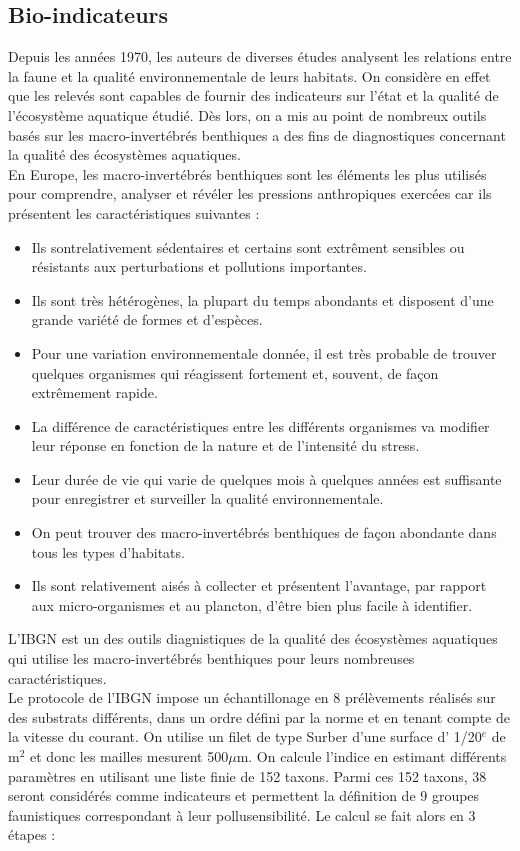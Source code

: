 \documentclass[10pt, article]{llncs}
\begin{document}
		\subsection{Bio-indicateurs}
			Depuis les années 1970, les auteurs de diverses études analysent les relations entre la faune et la qualité environnementale de leurs habitats. On considère en effet que les relevés sont capables de fournir des indicateurs sur l'état et la qualité de l'écosystème aquatique étudié. Dès lors, on a mis au point de nombreux outils basés sur les macro-invertébrés benthiques a des fins de diagnostiques concernant la qualité des écosystèmes aquatiques.\\
			En Europe, les macro-invertébrés benthiques sont les éléments les plus utilisés pour comprendre, analyser et révéler les pressions anthropiques exercées car ils présentent les caractéristiques suivantes :
			\begin{itemize}
				\item Ils sontrelativement sédentaires et certains sont extrêment sensibles ou résistants aux perturbations et pollutions importantes.
				\item Ils sont très hétérogènes, la plupart du temps abondants et disposent d'une grande variété de formes et d'espèces.
				\item Pour une variation environnementale donnée, il est très probable de trouver quelques organismes qui réagissent fortement et, souvent, de façon extrêmement rapide.
				\item La différence de caractéristiques entre les différents organismes va modifier leur réponse en fonction de la nature et de l'intensité du stress.
				\item Leur durée de vie qui varie de quelques mois à quelques années est suffisante pour enregistrer et surveiller la qualité environnementale.
				\item On peut trouver des macro-invertébrés benthiques de façon abondante dans tous les types d'habitats.
				\item Ils sont relativement aisés à collecter et présentent l'avantage, par rapport aux micro-organismes et au plancton, d'être bien plus facile à identifier.
			\end{itemize}
			L'IBGN est un des outils diagnistiques de la qualité des écosystèmes aquatiques qui utilise les macro-invertébrés benthiques pour leurs nombreuses caractéristiques. \\
			Le protocole de l'IBGN impose un échantillonage en 8 prélèvements réalisés sur des substrats différents, dans un ordre défini par la norme et en tenant compte de la vitesse du courant. On utilise un filet de type Surber d'une surface d' 1/20$^e$ de m$^2$ et donc les mailles mesurent 500$\mu$m. On calcule l'indice en estimant différents paramètres en utilisant une liste finie de 152 taxons. Parmi ces 152 taxons, 38 seront considérés comme indicateurs et permettent la définition de 9 groupes faunistiques correspondant à leur pollusensibilité. Le calcul se fait alors en 3 étapes :
\end{document}

